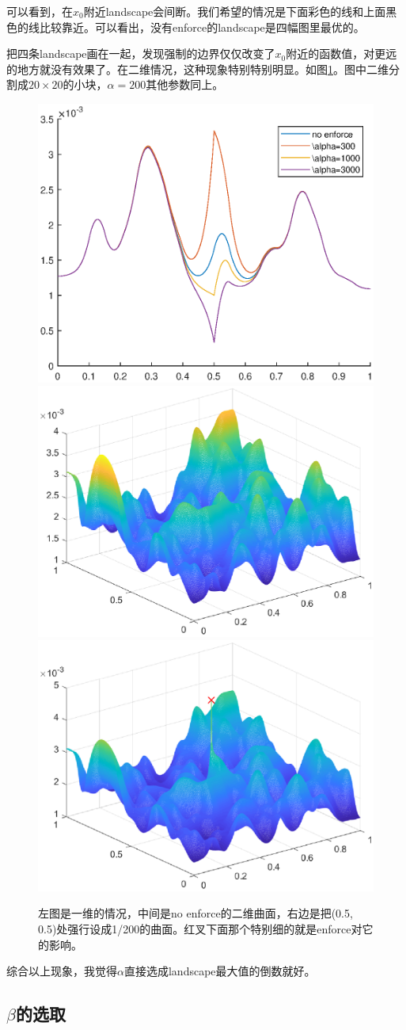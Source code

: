 \documentclass[UTF8,12pt]{article}
\begin{document}
可以看到，在$x_0$附近landscape会间断。我们希望的情况是下面彩色的线和上面黑色的线比较靠近。可以看出，没有enforce的landscape是四幅图里最优的。

把四条landscape画在一起，发现强制的边界仅仅改变了$x_0$附近的函数值，对更远的地方就没有效果了。在二维情况，这种现象特别特别明显。如图\ref{f2}。图中二维分割成$20 \times 20$的小块，$\alpha = 200$其他参数同上。

\begin{figure}[htbp]
    \centering
    \includegraphics[width=0.3\linewidth]{pic/nouse1d}
    \includegraphics[width=0.3\linewidth]{pic/nouse2d1}
    \includegraphics[width=0.3\linewidth]{pic/nouse2d2}
    \label{f2}
\caption{左图是一维的情况，中间是no enforce的二维曲面，右边是把(0.5, 0.5)处强行设成1/200的曲面。红叉下面那个特别细的就是enforce对它的影响。}
\end{figure}

综合以上现象，我觉得$\alpha$直接选成landscape最大值的倒数就好。

\subsection{$\beta$的选取}
\end{document}
